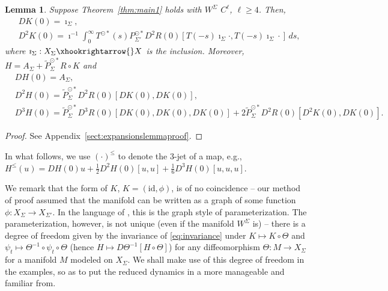 \documentclass[a4paper, 12pt, oneside, reqno, notitlepage]{amsart}
\theoremstyle{plain}
\newtheorem{lemma}[theorem]{Lemma}
\theoremstyle{definition}
\theoremstyle{remark}
\begin{document}
\begin{lemma} \label{lemma:expansions}
    Suppose Theorem~\ref{thm:main1} holds with $W^\Sigma$ $C^\ell$, $\ell \geq 4$.
    Then,
    \begin{align*}
        &DK(0) = \imath_\Sigma, \\
        &D^2K(0) = \imath^{-1} \int_{0}^\infty T^{\odot *}(s) P_{\Sigma'}^{\odot *} D^2R(0)[T(-s)\imath_\Sigma \cdot, T(-s)\imath_\Sigma \cdot] \, ds,
    \end{align*}
    where $\imath_\Sigma : X_\Sigma \xhookrightarrow{} X$ is the inclusion.
    Moreover, $H = A_\Sigma +  \widetilde{P}_\Sigma^{\odot *} R \circ K$ and
    \begin{align*}
        &DH(0) = A_\Sigma, \\
        & D^2H(0) = \widetilde{P}_\Sigma^{\odot *} D^2R(0)[DK(0),DK(0)], \\
        & D^3H(0) = \widetilde{P}_\Sigma^{\odot *} D^3R(0)[DK(0),DK(0),DK(0)] + 2  \widetilde{P}_\Sigma^{\odot *} D^2R(0)[D^2K(0),DK(0)].
    \end{align*}
\end{lemma}

\begin{proof}
    See Appendix~\ref{sect:expansionslemmaproof}.
\end{proof}

In what follows, we use $(\cdot)^{\leq}$ to denote the $3$-jet of a map, e.g., $H^\leq (u)= DH(0)u + \frac12 D^2H(0)[u,u] + \frac{1}{6}D^3H(0)[u,u,u]$.

We remark that the form of $K$, $K = (\mathrm{id},\phi)$, is of no coincidence -- our method of proof assumed that the manifold can be written as a graph of some function $\phi: X_\Sigma \to X_{\Sigma'}$. 
In the language of \cite{haro2016parameterization}, this is the graph style of parameterization.
The parameterization, however, is not unique (even if the manifold $W^\Sigma$ is) -- there is a degree of freedom given by the invariance of \eqref{eq:invariance} under $K \mapsto K \circ \Theta$ and $\psi_t \mapsto \Theta^{-1} \circ \psi_t \circ \Theta$ (hence $H \mapsto D \Theta^{-1}[H \circ \Theta]$) for any diffeomorphism $\Theta: M \to X_\Sigma$ for a manifold $M$ modeled on $X_\Sigma$.
We shall make use of this degree of freedom in the examples, so as to put the reduced dynamics in a more manageable and familiar from.
\end{document}
